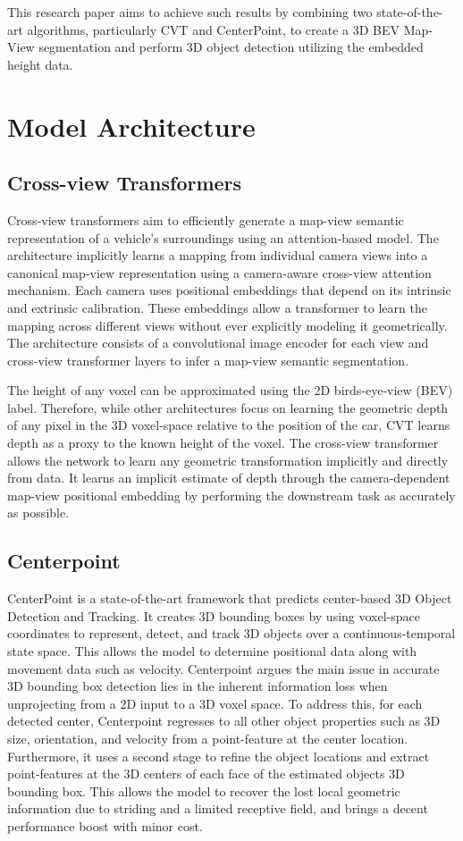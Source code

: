 \documentclass[a4paper,12pt]{article}
\begin{document}
\begin{multicols}{2}
This research paper aims to achieve such results by combining two state-of-the-art algorithms, particularly CVT and CenterPoint, to create a 3D BEV Map-View segmentation and perform 3D object detection utilizing the embedded height data.

\section{Model Architecture}
\subsection{Cross-view Transformers}
Cross-view transformers aim to efficiently generate a map-view semantic representation of a vehicle's surroundings using an attention-based model. The architecture implicitly learns a mapping from individual camera views into a canonical map-view representation using a camera-aware cross-view attention mechanism. Each camera uses positional embeddings that depend on its intrinsic and extrinsic calibration. These embeddings allow a transformer to learn the mapping across different views without ever explicitly modeling it geometrically. The architecture consists of a convolutional image encoder for each view and cross-view transformer layers to infer a map-view semantic segmentation.

The height of any voxel can be approximated using the 2D birds-eye-view (BEV) label. Therefore, while other architectures focus on learning the geometric depth of any pixel in the 3D voxel-space relative to the position of the car, CVT learns depth as a proxy to the known height of the voxel. The cross-view transformer allows the network to learn any geometric transformation implicitly and directly from data. It learns an implicit estimate of depth through the camera-dependent map-view positional embedding by performing the downstream task as accurately as possible.

\subsection{Centerpoint}
CenterPoint is a state-of-the-art framework that predicts center-based 3D Object Detection and Tracking. It creates 3D bounding boxes by using voxel-space coordinates to represent, detect, and track 3D objects over a continuous-temporal state space. This allows the model to determine positional data along with movement data such as velocity. Centerpoint argues the main issue in accurate 3D bounding box detection lies in the inherent information loss when unprojecting from a 2D input to a 3D voxel space. To address this, for each detected center, Centerpoint regresses to all other object properties such as 3D size, orientation, and velocity from a point-feature at the center location. Furthermore, it uses a second stage to refine the object locations and extract point-features at the 3D centers of each face of the estimated objects 3D bounding box. This allows the model to recover the lost local geometric information due to striding and a limited receptive field, and brings a decent performance boost with minor cost.


\end{multicols}
\end{document}
